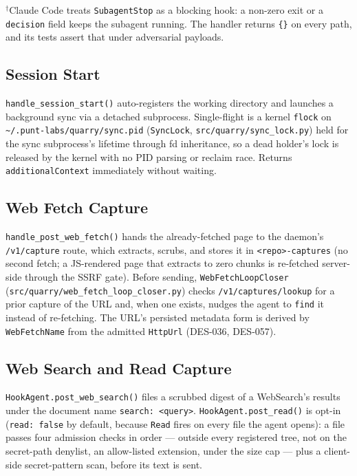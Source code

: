 \documentclass[a4paper,10pt]{article}
\newcommand{\modpath}[1]{\texttt{src/quarry/#1}}
\begin{document}
$^{\dagger}$Claude Code treats \texttt{SubagentStop} as a blocking hook:
a non-zero exit or a \texttt{decision} field keeps the subagent running.
The handler returns \texttt{\{\}} on every path, and its tests assert
that under adversarial payloads.

\subsection{Session Start}

\texttt{handle\_session\_start()} auto-registers the working directory
and launches a background sync via a detached subprocess.  Single-flight
is a kernel \texttt{flock} on \texttt{\~{}/.punt-labs/quarry/sync.pid}
(\texttt{SyncLock}, \modpath{sync\_lock.py}) held for the sync
subprocess's lifetime through fd inheritance, so a dead holder's lock is
released by the kernel with no PID parsing or reclaim race.  Returns
\texttt{additionalContext} immediately without waiting.

\subsection{Web Fetch Capture}

\texttt{handle\_post\_web\_fetch()} hands the already-fetched page to the
daemon's \texttt{/v1/capture} route, which extracts, scrubs, and stores
it in \texttt{<repo>-captures} (no second fetch; a JS-rendered page that
extracts to zero chunks is re-fetched server-side through the SSRF gate).
Before sending, \texttt{WebFetchLoopCloser}
(\modpath{web\_fetch\_loop\_closer.py}) checks \texttt{/v1/captures/lookup}
for a prior capture of the URL and, when one exists, nudges the agent to
\texttt{find} it instead of re-fetching.  The URL's persisted metadata form
is derived by \texttt{WebFetchName} from the admitted \texttt{HttpUrl}
(DES-036, DES-057).

\subsection{Web Search and Read Capture}

\texttt{HookAgent.post\_web\_search()} files a scrubbed digest of a
WebSearch's results under the document name \texttt{search: <query>}.
\texttt{HookAgent.post\_read()} is opt-in (\texttt{read: false} by default,
because \texttt{Read} fires on every file the agent opens): a file passes
four admission checks in order --- outside every registered tree, not on
the secret-path denylist, an allow-listed extension, under the size cap
--- plus a client-side secret-pattern scan, before its text is sent.
\end{document}
